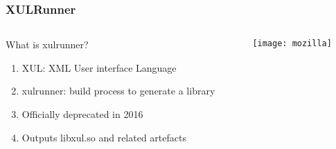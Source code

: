 \documentclass[
	notes=none,
	aspectratio=169
]{beamer}
\begin{document}

\begin{frame}
\frametitle{}

\begin{columns}[T]
\begin{column}[T]{0.5\textwidth}
\setlength{\parskip}{0.5em}

\vspace{0.5cm}





\end{column}
\begin{column}[T]{0.5\textwidth}
\setlength{\parskip}{0.5em}

\vspace{0.5cm}



\end{column}
\end{columns}

\end{frame}
\note{
\begin{enumerate}
\item -
\end{enumerate}
}


\begin{frame}
\frametitle{XULRunner}

\begin{columns}[T]
\begin{column}[T]{0.5\textwidth}
\setlength{\parskip}{0.5em}

\vspace{1.5cm}
What is xulrunner?
\begin{enumerate}
\setlength{\parskip}{0.5em}
\item XUL: XML User interface Language
\item xulrunner: build process to generate a library
\item Officially deprecated in 2016
\item Outputs libxul.so and related artefacts
\end{enumerate}

\end{column}
\begin{column}[T]{0.5\textwidth}
\setlength{\parskip}{0.5em}

\vspace{0.5cm}
\texttt{[image: mozilla]}

\end{column}
\end{columns}

\end{frame}
\note{
\begin{enumerate}
\item -
\end{enumerate}
}
\end{document}
